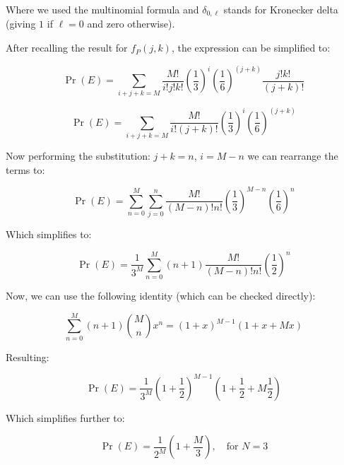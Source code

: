 \documentclass{article}
\theoremstyle{definition}
\begin{document}
\begin{appendices}
Where we used the multinomial formula and $\delta_{0,\ell}$ stands for Kronecker delta (giving $1$ if $\ell = 0$ and zero otherwise).

After recalling the result for $f_P(j,k)$, the expression can be simplified to:

\begin{equation}
    \Pr(E)
    =
    \sum_{i+j+k=M} \frac{M!}{i!j!k!}
    \left(\frac{1}{3}\right)^i
    \left(\frac{1}{6}\right)^{(j+k)}
    \frac{j! k!}{(j+k)!}
\end{equation}

\begin{equation}
    \Pr(E)
    =
    \sum_{i+j+k=M} \frac{M!}{i!(j+k)!}
    \left(\frac{1}{3}\right)^i
    \left(\frac{1}{6}\right)^{(j+k)}
\end{equation}

Now performing the substitution: $j+k=n$, $i=M-n$ we can rearrange the terms to:

\begin{equation}
    \Pr(E)
    =
    \sum_{n=0}^M \sum_{j=0}^n \frac{M!}{(M-n)! n!}
    \left(\frac{1}{3}\right)^{M-n}
    \left(\frac{1}{6}\right)^{n}
\end{equation}

Which simplifies to:

\begin{equation}
    \Pr(E)
    =
    \frac{1}{3^M} \sum_{n=0}^M (n+1) \frac{M!}{(M-n)! n!}
    \left(\frac{1}{2}\right)^{n}
\end{equation}

Now, we can use the following identity (which can be checked directly):

\begin{equation}
    \sum_{n=0}^M (n+1) \binom{M}{n}
    x^{n} 
    =
    (1+x)^{M-1} (1+x+M x)
\end{equation}

Resulting:

\begin{equation}
    \Pr(E)
    =
    \frac{1}{3^M} 
    \left(
    1+\frac{1}{2}
    \right)^{M-1}
    \left(
    1+\frac{1}{2} + M \frac{1}{2}
    \right)
\end{equation}

Which simplifies further to:

\begin{equation}
\boxed{
    \Pr(E)
    =
    \frac{1}{2^M} 
    \left(
    1 + \frac{M}{3}
    \right), \quad \text{for } N=3
    }
\end{equation}


\end{appendices}
\end{document}
